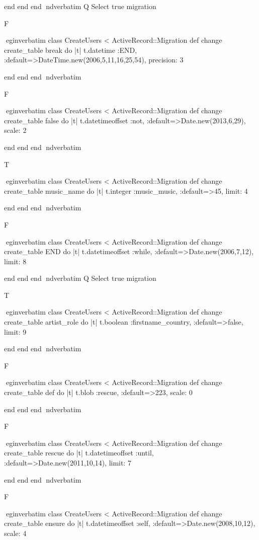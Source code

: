     end 
  end 
end
nd{verbatim}
Q
 Select true migration

F

egin{verbatim}
 class CreateUsers < ActiveRecord::Migration 
  def change 
    create_table break do |t| 
      t.datetime :END, :default=>DateTime.new(2006,5,11,16,25,54), precision: 3
    
    end 
  end 
end
nd{verbatim}

F

egin{verbatim}
 class CreateUsers < ActiveRecord::Migration 
  def change 
    create_table false do |t| 
      t.datetimeoffset :not, :default=>Date.new(2013,6,29), scale: 2
    
    end 
  end 
end
nd{verbatim}

T

egin{verbatim}
 class CreateUsers < ActiveRecord::Migration 
  def change 
    create_table music_name do |t| 
      t.integer :music_music, :default=>45, limit: 4
    
    end 
  end 
end
nd{verbatim}

F

egin{verbatim}
 class CreateUsers < ActiveRecord::Migration 
  def change 
    create_table END do |t| 
      t.datetimeoffset :while, :default=>Date.new(2006,7,12), limit: 8
    
    end 
  end 
end
nd{verbatim}
Q
 Select true migration

T

egin{verbatim}
 class CreateUsers < ActiveRecord::Migration 
  def change 
    create_table artist_role do |t| 
      t.boolean :firstname_country, :default=>false, limit: 9
    
    end 
  end 
end
nd{verbatim}

F

egin{verbatim}
 class CreateUsers < ActiveRecord::Migration 
  def change 
    create_table def do |t| 
      t.blob :rescue, :default=>223, scale: 0
    
    end 
  end 
end
nd{verbatim}

F

egin{verbatim}
 class CreateUsers < ActiveRecord::Migration 
  def change 
    create_table rescue do |t| 
      t.datetimeoffset :until, :default=>Date.new(2011,10,14), limit: 7
    
    end 
  end 
end
nd{verbatim}

F

egin{verbatim}
 class CreateUsers < ActiveRecord::Migration 
  def change 
    create_table ensure do |t| 
      t.datetimeoffset :self, :default=>Date.new(2008,10,12), scale: 4
    
